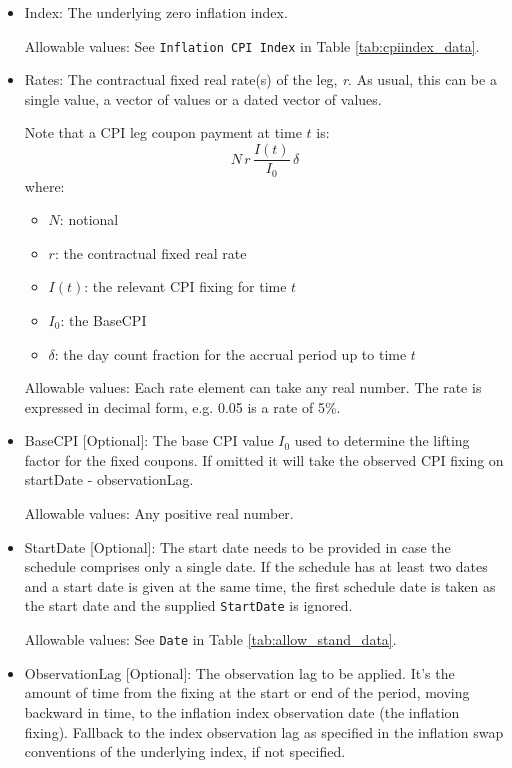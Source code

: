 \begin{itemize}
\item Index: The underlying zero inflation index.

Allowable values:  See \lstinline!Inflation CPI Index! in Table \ref{tab:cpiindex_data}.
\item Rates: The contractual fixed real rate(s) of the leg, \emph{r}. As usual, this can be a single value, a vector of values or a dated vector of
  values.
 
Note that a CPI leg coupon payment at time $t$ is:
$$
N\,r\,\frac{I(t)}{I_0}\,\delta
$$
where:
\begin{itemize}
\item $N$: notional
\item $r$: the contractual fixed real rate
\item $I(t)$: the relevant CPI fixing for time $t$
\item $I_0$: the BaseCPI
\item $\delta$: the day count fraction for the accrual period up to 
time $t$
\end{itemize}

 Allowable values: Each rate element can take any  real number. The rate is
  expressed in decimal form, e.g. 0.05 is a rate of 5\%.
  
\item BaseCPI [Optional]: The base CPI value $I_0$ used to determine the lifting factor for the fixed coupons. If omitted it will take the observed CPI fixing on startDate - observationLag.

Allowable values:  Any positive real number.

\item StartDate [Optional]: The start date needs to be provided in case the schedule comprises only a single date. If
  the schedule has at least two dates and a start date is given at the same time, the first schedule date is taken as 
  the start date and the supplied \lstinline!StartDate! is ignored.
  
Allowable values:  See \lstinline!Date! in Table \ref{tab:allow_stand_data}. 

\item ObservationLag [Optional]: The observation lag to be applied. It's the amount of time from the fixing at the start or end of the period, moving backward in time, to the inflation index observation date (the inflation fixing). Fallback to the index observation lag as specified in the inflation swap conventions of the underlying index, if not specified. 


\end{itemize}
